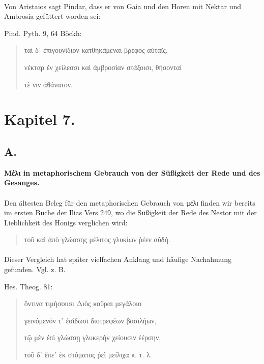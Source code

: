 \documentclass[a4paper, 11pt, oneside]{article}
\begin{document}
\paragraph{}
Von Aristaios sagt Pindar, dass er von Gaia und den Horen mit Nektar und Ambrosia gefüttert worden sei:

Pind. Pyth. 9, 64 Böckh:
\begin{quotation}
ταὶ δ᾽ ἐπιγουνίδιον κατθηκάμεναι βρέφος αὑταῖς,

νέκταρ ἐν χείλεσσι καὶ ἀμβροσίαν στάξοισι, θήσονταί

τὲ νιν ἀθάνατον.
\end{quotation}
\paragraph{}
\clearpage
\section{Kapitel 7.}
\subsection{A.}
\begin{center}
\textbf{Μέλι in metaphorischem Gebrauch von der Süßigkeit der Rede und des Gesanges.}
\end{center}
\paragraph{}
Den ältesten Beleg für den metaphorischen Gebrauch von μέλι finden wir bereits im ersten Buche der Ilias Vers 249, wo die Süßigkeit der Rede des Nestor mit der Lieblichkeit des Honigs verglichen wird:
\begin{quotation}
τοῦ καὶ ἀπὸ γλώσσης μέλιτος γλυκίων ῥέεν αὐδή.
\end{quotation}
\paragraph{}
Dieser Vergleich hat später vielfachen Anklang und häufige Nachahmung gefunden. Vgl. z. B.

Hes. Theog. 81:
\begin{quotation}
ὃντινα τιμήσουσι Διὸς κοῦραι μεγάλοιο

γεινόμενόν τ᾽ ἐσίδωσι διοτρεφέων βασιλήων,

τῷ μὲν ἐπὶ γλώσσῃ γλυκερὴν χείουσιν ἐέρσην,

τοῦ δ᾽ ἔπε᾽ ἐκ στόματος ῥεῖ μείλιχα κ. τ. λ.
\end{quotation}
\end{document}
